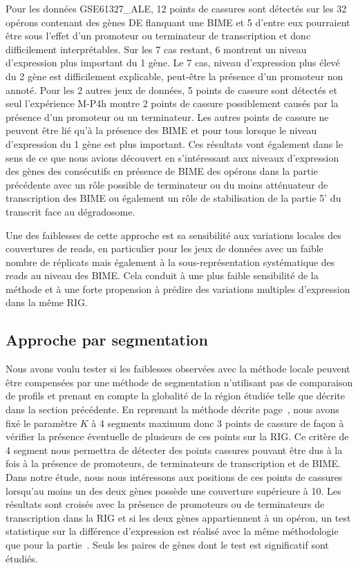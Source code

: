 \documentclass[12pt,a4paper]{report}
\begin{document}
\begin{onehalfspace}
Pour les données GSE61327\_ALE, 12 points de cassures sont détectés sur les 32 opérons contenant des gènes DE flanquant une BIME et 5 d'entre eux pourraient être sous l'effet d'un promoteur ou terminateur de transcription et donc difficilement interprétables. Sur les 7 cas restant, 6 montrent un niveau d'expression plus important du 1 gène. Le 7 cas, niveau d'expression plus élevé du 2 gène est difficilement explicable, peut-être la présence d'un promoteur non annoté. Pour les 2 autres jeux de données, 5 points de cassure sont détectés et seul l'expérience M-P4h montre 2 points de cassure possiblement causés par la présence d'un promoteur ou un terminateur. Les autres points de cassure ne peuvent être lié qu'à la présence des BIME et pour tous lorsque le niveau d'expression du 1 gène est plus important.
Ces résultats vont également dans le sens de ce que nous avions découvert en s'intéressant aux niveaux d'expression des gènes des consécutifs en présence de BIME des opérons dans la partie précédente avec un rôle possible de terminateur ou du moins atténuateur de transcription des BIME ou également un rôle de stabilisation de la partie 5' du transcrit face au dégradosome.

Une des faiblesses de cette approche est sa sensibilité aux variations locales des couvertures de reads, en particulier pour les jeux de données avec un faible nombre de réplicats mais également à la sous-représentation systématique des reads au niveau des BIME. Cela conduit à une plus faible sensibilité de la méthode et à une forte propension à prédire des variations multiples d’expression dans la même RIG.

\subsection*{Approche par segmentation}
Nous avons voulu tester si les faiblesses observées avec la méthode locale peuvent être compensées par une méthode de segmentation n'utilisant pas de comparaison de profils et prenant en compte la globalité de la région étudiée telle que décrite dans la section précédente.
En reprenant la méthode décrite page~\pageref{methode_segmentation}, nous avons fixé le paramètre $K$ à 4 segments maximum donc 3 points de cassure de façon à vérifier la présence éventuelle de plusieurs de ces points sur la RIG. Ce critère de 4 segment nous permettra de détecter des points cassures pouvant être dus à la fois à la présence de promoteurs, de terminateurs de transcription et de BIME. 
Dans notre étude, nous nous intéressons aux positions de ces points de cassures lorsqu'au moins un des deux gènes possède une couverture supérieure à 10. Les résultats sont croisés avec la présence de promoteurs ou de terminateurs de transcription dans la RIG et si les deux gènes appartiennent à un opéron, un test  statistique sur la différence d'expression est réalisé avec la même méthodologie que pour la partie~. Seuls les paires de gènes dont le test est significatif sont étudiés.


\end{onehalfspace}
\end{document}
